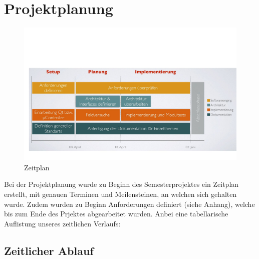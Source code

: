\chapter{Projektplanung}
\begin{figure}[H]
  \includegraphics[width=12cm]{content/pictures/Zeitplan.jpg}
  \caption{Zeitplan}
  \label{anh: Zeitplan}
\end{figure}
Bei der Projektplanung wurde zu Beginn des Semesterprojektes ein Zeitplan erstellt, mit genauen Terminen und 
Meilensteinen, an welchen sich gehalten wurde. Zudem wurden zu Beginn Anforderungen definiert (siehe Anhang), 
welche bis zum Ende des Prjektes abgearbeitet wurden.
Anbei eine tabellarische Auflistung unseres zeitlichen Verlaufs:

\section{Zeitlicher Ablauf}

